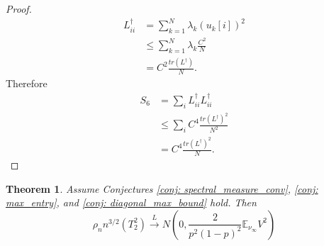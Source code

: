 \documentclass{article}
\newcommand{\Linv}{L^{\dagger}}
\theoremstyle{alden}
\newtheorem{theorem}{Theorem}
\theoremstyle{definition}
\theoremstyle{remark}
\begin{document}
\begin{proof}
	\begin{align*}
	\Linv_{ii} & = \sum_{k = 1}^{N} \lambda_k (u_k[i])^2 \\
	& \leq \sum_{k = 1}^{N} \lambda_k \frac{C^2}{N} \\
	& = C^2 \frac{tr(\Linv)}{N}.
	\end{align*}
	Therefore
	\begin{align*}
	S_6 & = \sum_{i} \Linv_{ii} \Linv_{ii} \\
	& \leq \sum_{i} C^4 \frac{tr(\Linv)^2}{N^2} \\
	& = C^4 \frac{tr(\Linv)^2}{N}.
	\end{align*}
\end{proof}

\begin{theorem}
	\label{theorem: asymptotic_null_dist}
	Assume Conjectures \ref{conj: spectral_measure_conv}, \ref{conj: max_entry}, and \ref{conj: diagonal_max_bound} hold. Then
	\begin{equation*}
	\rho_n n^{3/2} (T_2^2) \overset{L}{\to} N(0, \frac{2}{p^2(1-p)^2}\mathbb{E}_{\nu_{\infty}}{V^2})  
	\end{equation*}
\end{theorem}
\end{document}

